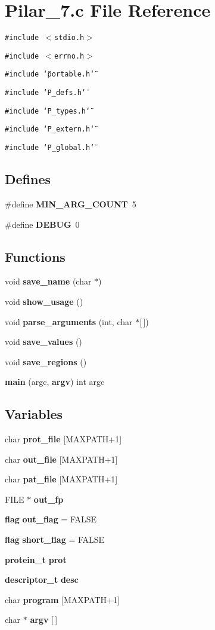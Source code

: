 \section{Pilar\_\-7.c File Reference}
\label{Pilar__7_8c}
{\tt \#include $<$stdio.h$>$}\par
{\tt \#include $<$errno.h$>$}\par
{\tt \#include \char`\"{}portable.h\char`\"{}}\par
{\tt \#include \char`\"{}P\_\-defs.h\char`\"{}}\par
{\tt \#include \char`\"{}P\_\-types.h\char`\"{}}\par
{\tt \#include \char`\"{}P\_\-extern.h\char`\"{}}\par
{\tt \#include \char`\"{}P\_\-global.h\char`\"{}}\par
\subsection*{Defines}
\begin{CompactItemize}
\item 
\#define {\bf MIN\_\-ARG\_\-COUNT}\ 5
\item 
\#define {\bf DEBUG}\ 0
\end{CompactItemize}
\subsection*{Functions}
\begin{CompactItemize}
\item 
void {\bf save\_\-name} (char $\ast$)
\item 
void {\bf show\_\-usage} ()
\item 
void {\bf parse\_\-arguments} (int, char $\ast$[$\,$])
\item 
void {\bf save\_\-values} ()
\item 
void {\bf save\_\-regions} ()
\item 
{\bf main} (argc, {\bf argv}) int argc
\end{CompactItemize}
\subsection*{Variables}
\begin{CompactItemize}
\item 
char {\bf prot\_\-file} [MAXPATH+1]
\item 
char {\bf out\_\-file} [MAXPATH+1]
\item 
char {\bf pat\_\-file} [MAXPATH+1]
\item 
FILE $\ast$ {\bf out\_\-fp}
\item 
{\bf flag} {\bf out\_\-flag} = FALSE
\item 
{\bf flag} {\bf short\_\-flag} = FALSE
\item 
{\bf protein\_\-t} {\bf prot}
\item 
{\bf descriptor\_\-t} {\bf desc}
\item 
char {\bf program} [MAXPATH+1]
\item 
char $\ast$ {\bf argv} [$\,$]
\end{CompactItemize}


